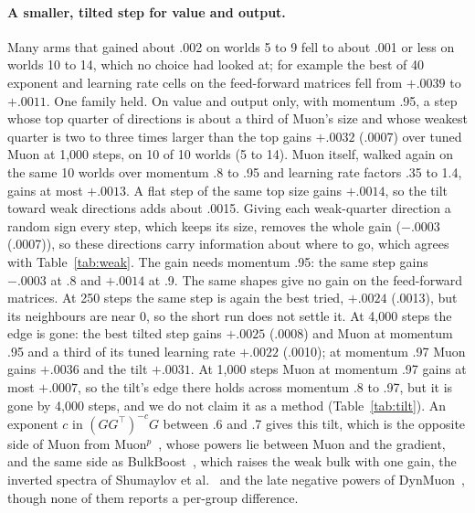 \documentclass[11pt]{article}
\begin{document}
\paragraph{A smaller, tilted step for value and output.} Many arms that gained about .002 on worlds 5 to 9 fell to about .001 or less on worlds 10 to 14, which no choice had looked at; for example the best of 40 exponent and learning rate cells on the feed-forward matrices fell from $+.0039$ to $+.0011$. One family held. On value and output only, with momentum .95, a step whose top quarter of directions is about a third of Muon's size and whose weakest quarter is two to three times larger than the top gains $+.0032$ (.0007) over tuned Muon at 1,000 steps, on 10 of 10 worlds (5 to 14). Muon itself, walked again on the same 10 worlds over momentum .8 to .95 and learning rate factors .35 to 1.4, gains at most $+.0013$. A flat step of the same top size gains $+.0014$, so the tilt toward weak directions adds about .0015. Giving each weak-quarter direction a random sign every step, which keeps its size, removes the whole gain ($-.0003$ (.0007)), so these directions carry information about where to go, which agrees with Table~\ref{tab:weak}. The gain needs momentum .95: the same step gains $-.0003$ at .8 and $+.0014$ at .9. The same shapes give no gain on the feed-forward matrices. At 250 steps the same step is again the best tried, $+.0024$ (.0013), but its neighbours are near 0, so the short run does not settle it. At 4,000 steps the edge is gone: the best tilted step gains $+.0025$ (.0008) and Muon at momentum .95 and a third of its tuned learning rate $+.0022$ (.0010); at momentum .97 Muon gains $+.0036$ and the tilt $+.0031$. At 1,000 steps Muon at momentum .97 gains at most $+.0007$, so the tilt's edge there holds across momentum .8 to .97, but it is gone by 4,000 steps, and we do not claim it as a method (Table~\ref{tab:tilt}). An exponent $c$ in $(GG^\top)^{-c}G$ between .6 and .7 gives this tilt, which is the opposite side of Muon from Muon$^p$~\cite{muonp}, whose powers lie between Muon and the gradient, and the same side as BulkBoost~\cite{bulkboost}, which raises the weak bulk with one gain, the inverted spectra of Shumaylov et al.~\cite{shumaylov} and the late negative powers of DynMuon~\cite{dynmuon}, though none of them reports a per-group difference.
\end{document}
